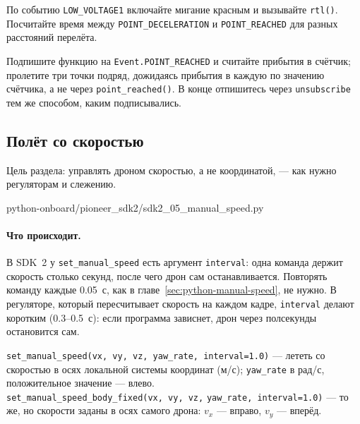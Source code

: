 \begin{taskbox}
По событию \verb|LOW_VOLTAGE1| включайте мигание красным и вызывайте \verb|rtl()|. Посчитайте время между \verb|POINT_DECELERATION| и \verb|POINT_REACHED| для разных расстояний перелёта.
\end{taskbox}

\begin{taskbox}
Подпишите функцию на \verb|Event.POINT_REACHED| и считайте прибытия в счётчик; пролетите три точки подряд, дожидаясь прибытия в каждую по значению счётчика, а не через \verb|point_reached()|. В конце отпишитесь через \verb|unsubscribe| тем же способом, каким подписывались.
\end{taskbox}

\subsection{Полёт со скоростью}

Цель раздела: управлять дроном скоростью, а не координатой, --- как нужно регуляторам и слежению.

\begin{codefile}[python]{python-onboard/pioneer_sdk2/sdk2_05_manual_speed.py}
\end{codefile}

\paragraph{Что происходит.} В SDK~2 у \verb|set_manual_speed| есть аргумент \verb|interval|: одна команда держит скорость столько секунд, после чего дрон сам останавливается. Повторять команду каждые 0.05~с, как в главе~\ref{sec:python-manual-speed}, не нужно. В регуляторе, который пересчитывает скорость на каждом кадре, \verb|interval| делают коротким (0.3--0.5~с): если программа зависнет, дрон через полсекунды остановится сам.

\begin{codebox}
\verb|set_manual_speed(vx, vy, vz, yaw_rate, interval=1.0)| --- лететь со скоростью в осях локальной системы координат (м/с); \verb|yaw_rate| в рад/с, положительное значение --- влево.\\
\verb|set_manual_speed_body_fixed(vx, vy, vz,| \verb|yaw_rate, interval=1.0)| --- то же, но скорости заданы в осях самого дрона: $v_x$ --- вправо, $v_y$ --- вперёд.
\end{codebox}

